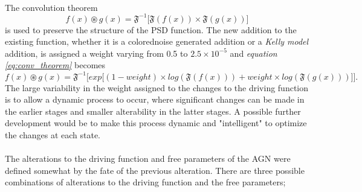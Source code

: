 \documentclass[a4paper, 12pt, twoside]{article}
\begin{document}
\\
The convolution theorem
\begin{equation}
f(x) \circledast g(x) = \mathfrak{F}^{-1}\Big[\mathfrak{F}(f(x)) \times \mathfrak{F}(g(x))\Big]
\label{eq:conv_theorem}
\end{equation}
is used to preserve the structure of the PSD function. The new addition to the existing function, whether it is a colorednoise generated addition or a \emph{Kelly model} addition, is assigned a weight varying from 0.5 to $2.5 \times 10^{-5}$ and \emph{equation \ref{eq:conv_theorem}} becomes
\begin{equation}
f(x) \circledast g(x) = \mathfrak{F}^{-1}\bigg[exp\Big[(1-weight)\times log(\mathfrak{F}(f(x))) + weight\times log(\mathfrak{F}(g(x)))\Big]\bigg].
\label{eq:conv_theorem_altered}
\end{equation}
The large variability in the weight assigned to the changes to the driving function is to allow a dynamic process to occur, where significant changes can be made in the earlier stages and smaller alterability in the latter stages. A possible further development would be to make this process dynamic and "intelligent" to optimize the changes at each state. \\
\\
The alterations to the driving function and free parameters of the AGN were defined somewhat by the fate of the previous alteration. There are three possible combinations of alterations to the driving function and the free parameters;
\end{document}
